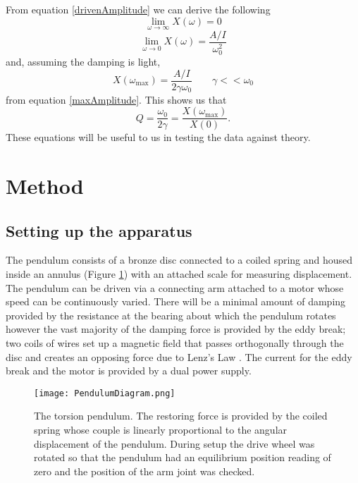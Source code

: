 \documentclass[12pt]{article}
\begin{document}
From equation \ref{drivenAmplitude} we can derive the following
\begin{equation}
\lim_{\omega \to \infty}X(\omega)=0
\label{amplitudeInfinity}
\end{equation}
\begin{equation}
\lim_{\omega \to 0}X(\omega)=\frac{A/I}{\omega_0^2}
\label{amplitudeZero}
\end{equation}
and, assuming the damping is light,
\begin{equation}
X(\omega_\text{max})=\frac{A/I}{2\gamma\omega_0} \qquad \gamma<<\omega_0
\end{equation}
from equation \ref{maxAmplitude}. This shows us that
\begin{equation}
Q=\frac{\omega_0}{2\gamma}=\frac{X(\omega_\text{max})}{X(0)}.
\label{MAXqualityFactor}
\end{equation}
These equations will be useful to us in testing the data against theory.

\section{Method}
\subsection{Setting up the apparatus}
The pendulum consists of a bronze disc connected to a coiled spring and housed inside an annulus (Figure \ref{pendulumDiagram}) with an attached scale for measuring displacement. The pendulum can be driven via a connecting arm attached to a motor whose speed can be continuously varied. There will be a minimal amount of damping provided by the resistance at the bearing about which the pendulum rotates however the vast majority of the damping force is provided by the eddy break; two coils of wires set up a magnetic field that passes orthogonally through the disc and creates an opposing force due to Lenz's Law \cite{feynman}. The current for the eddy break and the motor is provided by a dual power supply.
\begin{figure}[ht]
    \centering
    \texttt{[image: PendulumDiagram.png]}
    \caption{The torsion pendulum. The restoring force is provided by the coiled spring whose couple is linearly proportional to the angular displacement of the pendulum. During setup the drive wheel was rotated so that the pendulum had an equilibrium position reading of zero and the position of the arm joint was checked.}
    \label{pendulumDiagram}
\end{figure}
\end{document}
